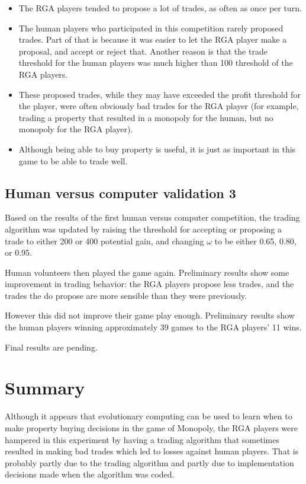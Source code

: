 \begin{itemize}
  \item {The RGA players tended to propose a lot of trades, as often
  as once per turn.}
  \item {The human players who participated in this competition rarely proposed
  trades. Part of that is because it was easier to let the RGA player make a
  proposal, and accept or reject that. Another reason is that the trade
  threshold for the human players was much higher than 100 threshold of the RGA
  players.}
  \item {These proposed trades, while they may have exceeded the profit
  threshold for the player, were often obviously bad trades for the RGA player
  (for example, trading a property that resulted in a monopoly for the human,
  but no monopoly for the RGA player).}
  \item {Although being able to buy property is useful, it is just as important
  in this game to be able to trade well.}
\end{itemize}

\subsection{Human versus computer validation 3} \label{6_humanVRGA3}

Based on the results of the first human versus computer competition, the trading
algorithm was updated by raising the threshold for accepting or proposing a
trade to either 200 or 400 potential gain, and changing \(\omega\) to be either
0.65, 0.80, or 0.95.

Human volunteers then played the game again. Preliminary results show some
improvement in trading behavior: the RGA players propose less trades, and the
trades the do propose are more sensible than they were previously.

However this did not improve their game play enough. Preliminary results show
the human players winning approximately 39 games to the RGA players' 11 wins.

Final results are pending.
 
\section{Summary}

Although it appears that evolutionary computing can be used to learn when to
make property buying decisions in the game of Monopoly, the RGA players were
hampered in this experiment by having a trading algorithm that sometimes
resulted in making bad trades which led to losses against human players. That is
probably partly due to the trading algorithm and partly due to implementation
decisions made when the algorithm was coded.

